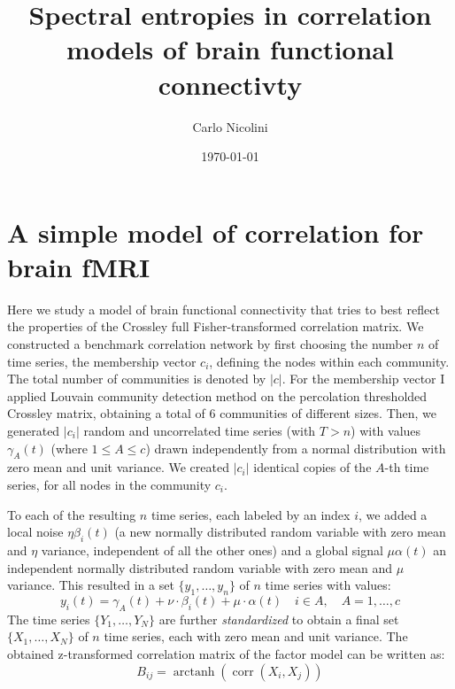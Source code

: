 \documentclass[a4paper]{article}
\DeclareMathOperator\arctanh{arctanh}
\DeclareMathOperator\corr{corr}
\begin{document}
\title{Spectral entropies in correlation models of brain functional connectivty}
\author{Carlo Nicolini}
\date{\today}
\maketitle

\section{A simple model of correlation for brain fMRI}
Here we study a model of brain functional connectivity that tries to best reflect the properties of the Crossley full Fisher-transformed correlation matrix.
We constructed a benchmark correlation network by first choosing the number $n$ of time series, the membership vector $c_i$, defining the nodes within each community. The total number of communities is denoted by $|c|$.
For the membership vector I applied Louvain community detection method on the percolation thresholded Crossley matrix, obtaining a total of 6 communities of different sizes.
Then, we generated $|c_i|$ random and uncorrelated time series (with $T>n$) with values $\gamma_A(t)$ (where $1\le A\le c$) drawn independently from a normal distribution with zero mean and unit variance.
We created $|c_i|$ identical copies of the $A$-th time series, for all nodes in the community $c_i$.

To each of the resulting $n$ time series, each labeled by an index $i$, we added a local noise $\eta \beta_i(t)$ (a new normally distributed random variable with zero mean and $\eta$ variance, independent of all the other ones) and a global signal $\mu \alpha(t)$ an independent normally distributed random variable with zero mean and $\mu$ variance.
This resulted in a set $\{y_1,\dots,y_n\}$ of $n$ time series with values:
\begin{equation}
y_i(t)= \gamma_A(t) + \nu\cdot \beta_i(t) + \mu\cdot \alpha(t) \quad i\in A, \quad A=1,\ldots,c
\label{eq:bench}
\end{equation}
The time series $\{Y_1,\dots,Y_N\}$ are further \emph{standardized} to obtain a final set $\{X_1,\dots,X_N\}$ of $n$ time series, each with zero mean and unit variance.
The obtained z-transformed correlation matrix of the factor model can be written as:
\begin{equation}
B_{ij} = \arctanh\left( \corr(X_i, X_j) \right)
\end{equation}
\end{document}
